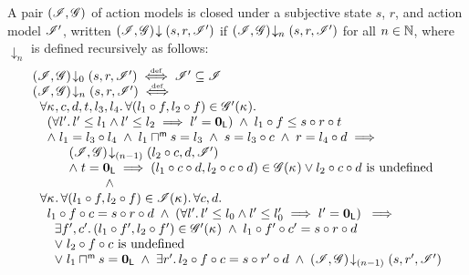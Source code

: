 %
%
\begin{definition}
A pair $(\mathscr{I}, \mathscr{G})$ of action models is closed under a subjective state $s$, $r$, and action
model $\mathscr{I}'$, written $\left(\mathscr{I}, \mathscr{G}\right) \!\downarrow \left(s, r, \mathscr{I}'\right)$ if $\left(\mathscr{I}, \mathscr{G}\right) \!\downarrow_{n} \left(s, r, \mathscr{I}'\right)$ for all $n \in \mathbb{N}$, where $\downarrow_{n}$ is defined recursively as follows:
%
\[
\begin{array}{l}
	\left(\mathscr{I}, \mathscr{G}\right) \!\downarrow_{0} \left(s, r, \mathscr{I}'\right) \mathrel{\stackrel{\smash{\scriptscriptstyle{\mathrm{def}}}}{\iff}} \mathscr{I}' \subseteq \mathscr{I}\\
	
	\left(\mathscr{I}, \mathscr{G}\right) \!\downarrow_{n} \left(s, r, \mathscr{I}'\right) \mathrel{\stackrel{\smash{\scriptscriptstyle{\mathrm{def}}}}{\iff}} \\ 

	\hspace*{0.2cm}\forall \kappa_{}, c, d, t, l_3, l_4.\,\forall (l_1 \circ f, l_2 \circ f) \in \mathscr{G}'(\kappa_{}).\, \\
	\hspace*{0.4cm}\left(\forall l'.\, l' \leq l_1 \land l' \leq l_2 \implies l' = \mathbf{0}_{\textsf{L}}\right) \;\land\; l_1 \circ f \leq  s \circ r \circ t \\
	\hspace*{0.4cm} \land\; l_1 = l_3 \circ l_4 \;\land\; l_1 \sqcap_{}^{\textsf{m}} s = l_3 \;\land\; s = l_3 \circ c \;\land\; r = l_4 \circ d \implies\\
	\hspace*{1cm} \left(\mathscr{I}, \mathscr{G}\right) \!\downarrow_{(n-1)} \left(l_2 \circ c, d, \mathscr{I}'\right)\\
	\hspace*{1cm}\land\; t = \mathbf{0}_{\textsf{L}} \implies (l_1 \circ c \circ d, l_2 \circ c \circ d) \in \mathscr{G}(\kappa_{}) \lor l_2 \circ c \circ d \text{ is undefined} \\
	
		\hspace*{2cm} \land\\
	

  \hspace*{0.2cm}\forall \kappa_{}.\, \forall (l_1 \circ f, l_2 \circ f) \in \mathscr{I}(\kappa_{}).\, \forall c, d.\, \\
  \hspace*{0.4cm} l_1 \circ f \circ c = s \circ r \circ d \;\land\; \left(\forall l'.\, l' \leq l_0 \land l' \leq l'_0 \implies l' = \mathbf{0}_{\textsf{L}}\right)  \;\implies\\
  \hspace*{0.6cm}\exists f', c'.\, (l_1 \circ f', l_2 \circ f') \in \mathscr{G}'(\kappa_{}) \;\land\; l_1 \circ f' \circ c' =  s \circ r \circ d\\
	

		\hspace*{0.6cm}\lor\;l_2 \circ f \circ c \text{ is undefined}\\
		\hspace*{0.6cm}\lor\; l_1 \sqcap_{}^{\textsf{m}} s = \mathbf{0}_{\textsf{L}} \;\land\; \exists r'.\, l_2 \circ f \circ c = s \circ r' \circ d \;\land\; \left(\mathscr{I}, \mathscr{G}\right) \!\downarrow_{(n-1)} \left(s, r', \mathscr{I}'\right)

\end{array}
\]
%
\end{definition}
